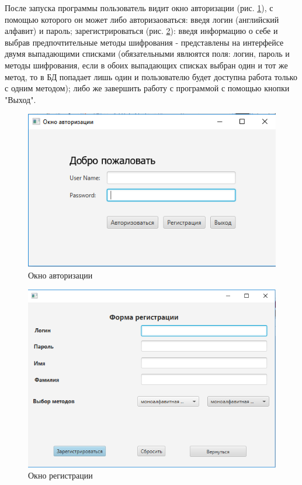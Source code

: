 \documentclass[a4paper,12pt]{article}
\begin{document}
\par После запуска программы пользователь видит окно авторизации (рис. \ref{fig:login_form}), с помощью которого он может либо авторизаоваться: введя логин (английский алфавит) и пароль; зарегистрироваться (рис. \ref{fig:registry_form}): введя информацию о себе и выбрав предпочтительные методы шифрования - представлены на интерфейсе двумя выпадающими списками (обязательными явлюятся поля: логин, пароль и методы шифрования, если в обоих выпадающих списках выбран один и тот же метод, то в БД попадает лишь один и пользователю будет доступна работа только с одним методом); либо же завершить работу с программой с помощью кнопки "Выход".
\begin{center}
	\begin{figure}[h!]
		\centering
   		\includegraphics[scale=0.5]{img/login_form.png}
   		\caption{Окно авторизации}
   		\label{fig:login_form}
    \end{figure}
\end{center}
\begin{center}
	\begin{figure}[h!]
		\centering
   		\includegraphics[scale=0.5]{img/registry_form.png}
   		\caption{Окно регистрации}
   		\label{fig:registry_form}
    \end{figure}
\end{center}
\end{document}
